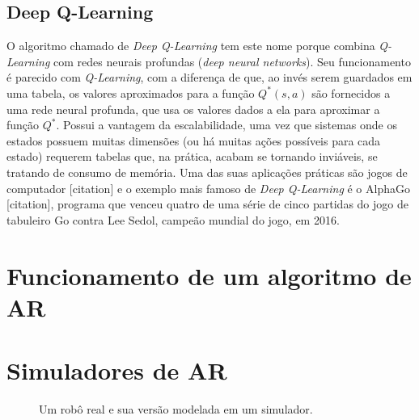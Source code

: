 \documentclass[cic,tc]{iiufrgs}
\begin{document}
\subsection{Deep Q-Learning}
O algoritmo chamado de \textit{Deep Q-Learning} tem este nome porque combina
\textit{Q-Learning} com redes neurais profundas (\textit{deep neural networks}).
Seu funcionamento é parecido com \textit{Q-Learning}, com a diferença de que, ao
invés serem guardados em uma tabela, os valores aproximados para a função
$Q^*(s, a)$ são fornecidos a uma rede neural profunda, que usa os valores
dados a ela para aproximar a função $Q^*$. Possui a vantagem da escalabilidade,
uma vez que sistemas onde os estados possuem muitas dimensões (ou há muitas
ações possíveis para cada estado) requerem tabelas que, na prática, acabam se
tornando inviáveis, se tratando de consumo de memória. Uma das suas aplicações
práticas são jogos de computador [citation] e o exemplo mais famoso de \textit{
Deep Q-Learning} é o AlphaGo [citation], programa que venceu quatro de uma série
de cinco partidas do jogo de tabuleiro Go contra Lee Sedol, campeão mundial do
jogo, em 2016.



\section{Funcionamento de um algoritmo de AR}
\blindtext
\section{Simuladores de AR}
\begin{figure}[h]
    \caption{Um robô real e sua versão modelada em um simulador.}
    \begin{center}
    \end{center}
    \label{fig:mujocosimulator}
\end{figure}
\end{document}
